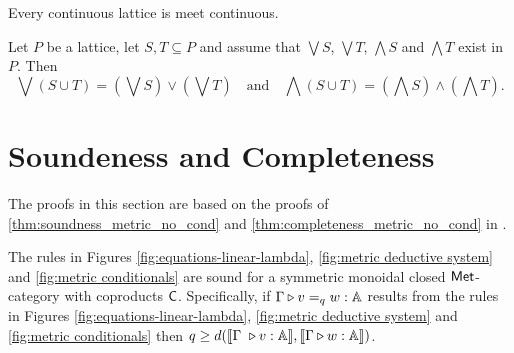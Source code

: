 \begin{lemma} \cite[Proposition I-1.8]{gierzContinuousLatticesDomains2003} \label{lem:meet_continuos}
  Every continuous lattice is meet continuous.
\end{lemma}

\begin{lemma} \cite[Lemma 2.23]{daveyIntroductionLatticesOrder2002} \label{lem:sup_union}
Let \( P \) be a lattice, let \( S, T \subseteq P \) and assume that \( \bigvee S \),
\( \bigvee T \), \( \bigwedge S \) and \( \bigwedge T \) exist in \( P \). Then
$$ \bigvee(S \cup T) = \left(\bigvee S\right) \vee \left(\bigvee T\right) \quad \text{and} \quad \bigwedge(S \cup T) = \left(\bigwedge S\right) \wedge \left(\bigwedge T\right) . $$
\end{lemma}


\section{Soundeness and Completeness}
The proofs in this section are based on the proofs of 
\autoref{thm:soundness_metric_no_cond} and \autoref{thm:completeness_metric_no_cond} in \cite{dahlqvist2023syntactic}.

\begin{theorem}
  The rules in Figures \ref{fig:equations-linear-lambda}, \ref{fig:metric deductive system} and \ref{fig:metric conditionals} are sound for a  symmetric monoidal closed $\mathsf{Met}$-category with coproducts $\mathsf{C}$. Specifically, if $\Gamma \triangleright v =_{q} w : \mathbb{A} $ results from the rules in Figures  \ref{fig:equations-linear-lambda}, \ref{fig:metric deductive system} and \ref{fig:metric conditionals} then $q \geq d( \llbracket \Gamma  \vljud v : \typeA \rrbracket, \llbracket\Gamma \vljud w : \typeA \rrbracket)$.
\end{theorem}

